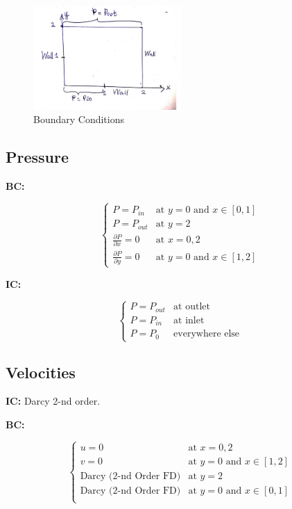\documentclass[a4paper,12pt]{article}
\begin{document}

\begin{figure}[H]
    \centering
    \includegraphics[width=0.5\textwidth]{img/diagram.pdf}
    \caption{Boundary Conditions}
    \label{fig:img-diagram-pdf}
\end{figure}

\subsection{Pressure}

\textbf{BC:}

\[
\begin{cases}
    P = P_{in} &\text{at } y = 0
    \text{ and } x \in [0, 1] \\
    P = P_{out} &\text{at } y = 2 \\
    \frac{\partial P}{\partial x} = 0 &\text{at }
    x = 0, 2 \\
    \frac{\partial P}{\partial y} = 0 &\text{at }
    y = 0 \text{ and } x \in [1, 2]
\end{cases}
\] 

\textbf{IC:}

\[
\begin{cases}
    P = P_{out} &\text{at outlet} \\
    P = P_{in}  &\text{at inlet} \\
    P = P_0     &\text{everywhere else}
\end{cases}
\] 

\subsection{Velocities}

\textbf{IC:} Darcy 2-nd order.

\textbf{BC:}

\[
\begin{cases}
    u = 0 &\text{at } x = 0, 2 \\
    v = 0 &\text{at } y = 0 \text{ and } x \in [1, 2] \\
    \text{Darcy (2-nd Order FD)}
          &\text{at } y = 2 \\
    \text{Darcy (2-nd Order FD)}
          &\text{at } y = 0
    \text{ and } x \in [0, 1]\\
\end{cases}
\] 
\end{document}
